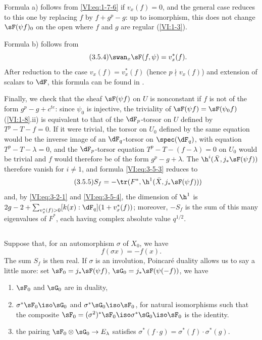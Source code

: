 \documentclass[oneside]{book}
\begin{document}
Formula a) follows from \eqref{VI:eq:1-7-6} if $v_x(f)=0$, and the general 
case reduces to this one by replacing $f$ by $f+g^p-g$: up to isomorphism, this 
does not change $\sF(\psi f)_0$ on the open where $f$ and $g$ are regular 
(\ref{VI:1-3}). 

Formula b) follows from 
\begin{equation*}\tag{3.5.4}\label{VI:eq:3-5-4}
  \swan_x \sF(f,\psi) = v_x^\ast(f) \text{.} 
\end{equation*}
After reduction to the case $v_x(f)=v_x^\ast(f)$ (hence $p\nmid v_x(f)$) 
and extension of scalars to $\dF$, this formula can be found in 
\cite[4.4]{se61}.

Finally, we check that the sheaf $\sF(\psi f)$ on $U$ is nonconstant if 
$f$ is not of the form $g^p-g+c^{t e}$: since $\psi_0$ is injective, the 
triviality of $\sF(\psi f)=\sF(\psi_0 f)$ (\ref{VI:1-8}.ii) is equivalent to 
that of the $\dF_p$-torsor on $U$ defined by $T^p-T-f=0$. If it were trivial, 
the torsor on $U_0$ defined by the same equation would be the inverse image of an 
$\dF_q$-torsor on $\spec(\dF_q)$, with equation $T^p-T-\lambda=0$, and the 
$\dF_p$-torsor equation $T^p-T-(f-\lambda)=0$ on $U_0$ would be trivial 
and $f$ would therefore be of the form $g^p-g+\lambda$. The 
$\h^i(\bar X,j_\ast \sF(\psi f))$ therefore vanish for $i\ne 1$, and formula 
\eqref{VI:eq:3-5-3} reduces to 
\begin{equation*}\tag{3.5.5}\label{VI:eq:3-5-5}
  S_f = -\tr(F^\ast,\h^1(\bar X,j_\ast \sF(\psi f))) 
\end{equation*}
and, by \eqref{VI:eq:3-2-1} and \eqref{VI:eq:3-5-4}, the dimension of $\h^1$ is 
$2 g-2+\sum_{v_x^\ast(f)>0} [k(x):\dF_q](1+v_x^\ast(f))$; moreover, $-S_f$ 
is the sum of this many eigenvalues of $F^\ast$, each having complex 
absolute value $q^{1/2}$. 





\subsection{}\label{VI:3-6}

Suppose that, for an automorphism $\sigma$ of $X_0$, we have 
\[
  f(\sigma x) = - f(x) \text{.} 
\]
The sum $S_f$ is then real. If $\sigma$ is an involution, Poincaré 
duality allows us to say a little more: set 
$\sF_0=j_\ast \sF(\psi f)$, $\sG_0 = j_\ast \sF(\psi(-f))$, we have 
\begin{enumerate}[\indent a)]
  \item $\sF_0$ and $\sG_0$ are in duality, 
  \item $\sigma^\ast \sF_0 \iso \sG_0$ and $\sigma^\ast \sG_0 \iso \sF_0$, for 
    natural isomorphisms such that the composite 
    $\sF_0=(\sigma^2)^\ast \sF_0 \iso \sigma^\ast \sG_0 \iso \sF_0$ 
    is the identity. 
  \item the pairing $\sF_0\otimes \sG_0 \to E_\lambda$ satisfies 
    $\sigma^\ast(f\cdot g) = \sigma^\ast(f) \cdot \sigma^\ast (g)$. 
\end{enumerate} 
\end{document}
